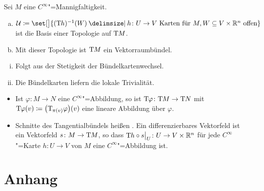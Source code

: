 \begin{proposition}[{name=[Topologie auf dem Tangentialbündel]}]
	Sei $M$ eine $C^\infty$"=Mannigfaltigkeit.
	\begin{enumerate}[a)]
		\item $\mathcal{U} \coloneqq \set[\big]{(\Tang h) ^{-1} (W) \given h \colon U \to V \text{ Karten für }M , W \subseteq V \times\mathbb{R}^n \text{ offen}} $ ist die Basis einer Topologie auf $\mathrm{T}\mkern-0.85mu M$.
		\item Mit dieser Topologie ist $\mathrm{T}\mkern-0.85mu M$ ein Vektorraumbündel.
	\end{enumerate}
\end{proposition}
\begin{beweis}
	\begin{enumerate}[(i)]
		\item Folgt aus der Stetigkeit der Bündelkartenwechsel.
		\item Die Bündelkarten liefern die lokale Trivialität. \qedhere
	\end{enumerate}
\end{beweis}

\begin{bemerkung}[{name=[glatte Vektorfelder]}]
	\begin{itemize}
		\item Ist $\varphi \colon M \to N$ eine $C^\infty$"=Abbildung, so ist $\mathrm{T}\mkern-0.85mu \varphi \colon \mathrm{T}\mkern-0.85mu M  \to \mathrm{T}\mkern-0.85mu N$ mit $\Tang \varphi(v) \coloneqq \enbrace*{\Tang_{\pi(v)} \varphi}(v)$ eine lineare Abbildung über $\varphi$.
		\item Schnitte des Tangentialbündels heißen . 
		Ein differenzierbares Vektorfeld ist ein Vektorfeld $s \colon M \to \mathrm{T}\mkern-0.85mu M$, so dass $\mathrm{T}\mkern-0.85mu h \circ s \big|_{U} \colon U \to V \times \mathbb{R}^n$ für jede $C^\infty$"=Karte $h \colon U \to V$ von $M$ eine $C^\infty$"=Abbildung ist.
	\end{itemize}
\end{bemerkung}

\cleardoubleoddemptypage
{}
\setcounter{page}{1}
\cleardoubleoddemptypage
\appendix

\section{Anhang} %
\label{sec:anhang}

\printindex
\printbibliography
\listoffigures

